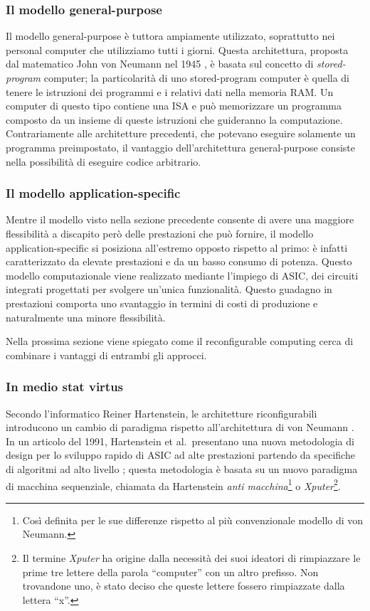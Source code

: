 \subsubsection{Il modello general-purpose}
Il modello general-purpose è tuttora ampiamente utilizzato, soprattutto nei personal
computer che utilizziamo tutti i giorni. Questa architettura, proposta dal matematico
John von Neumann nel 1945 \cite{First-Draft-Report-EDVAC}, è basata sul concetto di
\emph{stored-program} computer; la particolarità di uno stored-program computer è quella
di tenere le istruzioni dei programmi e i relativi dati nella memoria RAM. Un computer di
questo tipo contiene una \ac{ISA} e può memorizzare un programma composto da un insieme
di queste istruzioni che guideranno la computazione. Contrariamente alle architetture
precedenti, che potevano eseguire solamente un programma preimpostato, il vantaggio
dell'architettura general-purpose consiste nella possibilità di eseguire codice
arbitrario.

\subsubsection{Il modello application-specific}
Mentre il modello visto nella sezione precedente consente di avere una maggiore
flessibilità a discapito però delle prestazioni che può fornire, il modello
application-specific si posiziona all'estremo opposto rispetto al primo: è infatti
caratterizzato da elevate prestazioni e da un basso consumo di potenza. Questo modello
computazionale viene realizzato mediante l'impiego di \ac{ASIC}, dei circuiti integrati
progettati per svolgere un'unica funzionalità. Questo guadagno in prestazioni comporta
uno svantaggio in termini di costi di produzione e naturalmente una minore flessibilità.

Nella prossima sezione viene spiegato come il reconfigurable computing cerca di combinare
i vantaggi di entrambi gli approcci.

\subsubsection{In medio stat virtus}
Secondo l'informatico Reiner Hartenstein, le architetture riconfigurabili introducono un
cambio di paradigma rispetto all'architettura di von Neumann
\cite{HartensteinParadigmShift}. In un articolo del 1991, Hartenstein et al.~presentano
una nuova metodologia di design per lo sviluppo rapido di \ac{ASIC} ad alte prestazioni
partendo da specifiche di algoritmi ad alto livello \cite{HartensteinNovelASICDesign};
questa metodologia è basata su un nuovo paradigma di macchina sequenziale, chiamata da
Hartenstein \emph{anti macchina}\footnote{Così definita per le sue differenze rispetto al
più convenzionale modello di von Neumann.} o \emph{Xputer}\footnote{Il termine
\emph{Xputer} ha origine dalla necessità dei suoi ideatori di rimpiazzare le prime tre
lettere della parola ``computer'' con un altro prefisso. Non trovandone uno, è stato
deciso che queste lettere fossero rimpiazzate dalla lettera ``x''.}.

